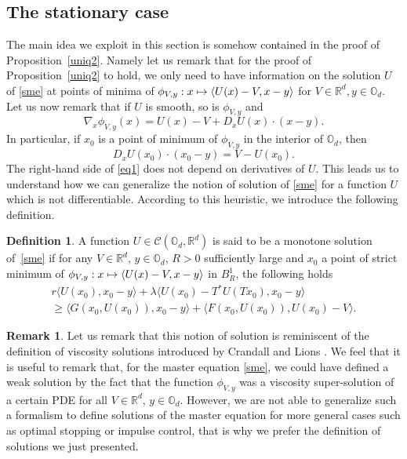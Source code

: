 \documentclass[JEP,XML,SOM,Unicode,NoEqCountersInSection,published]{cedram}
\let\mathcal\mathscr
\newcommand\mto{\mathchoice{\longmapsto}{\mapsto}{\mapsto}{\mapsto}}
\theoremstyle{definition}
\newtheorem{Def}{Definition}[section]
\newtheorem{Rem}{Remark}[section]
\begin{document}
\subsection{The stationary case}
The main idea we exploit in this section is somehow contained in the proof of Proposition~\ref{uniq2}. Namely let us remark that for the proof of Proposition~\ref{uniq2} to hold, we only need to have information on the solution $U$ of \eqref{sme} at points of minima of $\phi_{V,y}: x \mto \langle U(x)-V, x-y\rangle$ for $V \in \mathbb{R}^d, y \in \mathbb{O}_d$. Let us now remark that if $U$ is smooth, so is $\phi_{V,y}$ and
\begin{equation*}
\nabla_x \phi_{V,y}(x) = U(x)-V+D_x U(x)\cdot(x-y).
\end{equation*}
In particular, if $x_0$ is a point of minimum of $\phi_{V,y}$ in the interior of $\mathbb{O}_d$, then
\begin{equation}\label{eq1}
D_x U(x_0)\cdot(x_0-y) =V-U(x_0).
\end{equation}
The right-hand side of \eqref{eq1} does not depend on derivatives of $U$. This leads us to understand how we can generalize the notion of solution of \eqref{sme} for a function $U$ which is not differentiable. According to this heuristic, we introduce the following definition.
\begin{Def}\label{defmons}
A function $U \in \mathcal{C}(\mathbb{O}_d, \mathbb{R}^d)$ is said to be a monotone solution of~\eqref{sme} if for any $V \in \mathbb{R}^d$, $y \in \mathbb{O}_d$, $R>0$ sufficiently large and $x_0$ a point of strict minimum of $\phi_{V,y}: x \mto \langle U(x)-V, x-y\rangle$ in $B^1_R$, the following holds
\begin{multline}\label{smon}
r\langle U(x_0), x_0-y\rangle + \lambda \langle U(x_0)-T^*U(Tx_0),x_0-y\rangle \\
\geq
 \langle G(x_0, U(x_0)), x_0-y\rangle+\langle F(x_0,U(x_0)), U(x_0)-V\rangle.
\end{multline}
\end{Def}
\begin{Rem}
Let us remark that this notion of solution is reminiscent of the definition of viscosity solutions introduced by Crandall and Lions \cite{crandall1983viscosity}. We feel that it is useful to remark that, for the master equation \eqref{sme}, we could have defined a weak solution by the fact that the function $\phi_{V,y}$ was a viscosity super-solution of a certain PDE for all $V \in \mathbb{R}^d$, $y \in \mathbb{O}_d$. However, we are not able to generalize such a formalism to define solutions of the master equation for more general cases such as optimal stopping or impulse control, that is why we prefer the definition of solutions we just presented.
\end{Rem}
\end{document}
